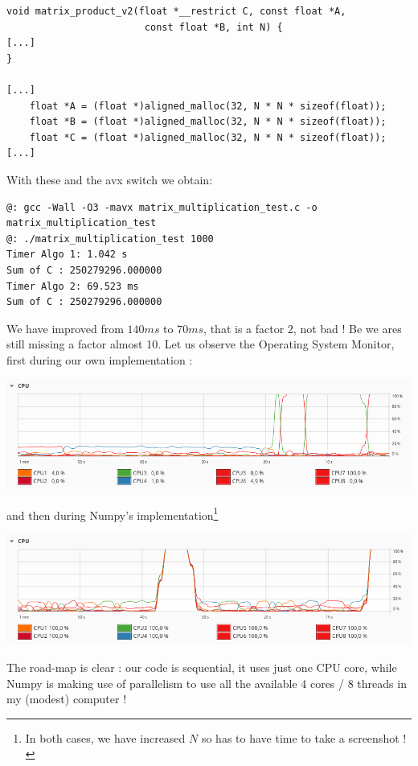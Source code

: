 \documentclass[12pt]{article}
\theoremstyle{plain}
\theoremstyle{remark}
\begin{document}
\begin{lstlisting}[style=C]
void matrix_product_v2(float *__restrict C, const float *A, 
						const float *B, int N) {
[...]
}

[...]
	float *A = (float *)aligned_malloc(32, N * N * sizeof(float));
	float *B = (float *)aligned_malloc(32, N * N * sizeof(float));
	float *C = (float *)aligned_malloc(32, N * N * sizeof(float));
[...]
\end{lstlisting}
With these and the avx switch we obtain:
\begin{lstlisting}[style=bash]
@: gcc -Wall -O3 -mavx matrix_multiplication_test.c -o matrix_multiplication_test
@: ./matrix_multiplication_test 1000
Timer Algo 1: 1.042 s
Sum of C : 250279296.000000
Timer Algo 2: 69.523 ms
Sum of C : 250279296.000000
\end{lstlisting}
We have improved from $140ms$ to $70ms$, that is a factor 2, not bad ! Be we
ares still missing a factor almost 10. Let us observe the Operating System 
Monitor, first during our own implementation : 
\begin{center}
\includegraphics[width=15cm]{data/mat_mult_one_core.png}
\end{center}
and then during Numpy's implementation\footnote{In both cases, we have increased
$N$ so has to have time to take a screenshot !} 
\begin{center}
\includegraphics[width=15cm]{data/mat_mult_all_core.png}
\end{center}

The road-map is clear : our code is sequential, it uses just one CPU core, while
Numpy is making use of parallelism to use all the available 4 cores / 8 threads
in my (modest) computer ! 

\medskip
\end{document}
